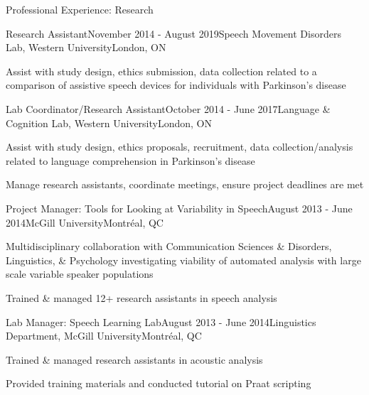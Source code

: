 \documentclass{resume} %
\begin{document}
\begin{rSection}{Professional Experience: Research}

	\begin{rSubsection}{Research Assistant}{November 2014 - August 2019}{Speech Movement Disorders Lab, Western University}{London, ON}
	\item Assist with study design, ethics submission, data collection related to a comparison of assistive speech devices for individuals with Parkinson's disease
	\end{rSubsection}
	
	
	\begin{rSubsection}{Lab Coordinator/Research Assistant}{October 2014 - June 2017}{Language \& Cognition Lab, Western University}{London, ON}
	\item Assist with study design, ethics proposals, recruitment, data collection/analysis related to language comprehension in Parkinson's disease
	\item Manage research assistants, coordinate meetings, ensure project deadlines are met
	\end{rSubsection}
	
	
	\begin{rSubsection}{Project Manager: Tools for Looking at Variability in Speech}{August 2013 - June 2014}{McGill University}{Montr\'eal, QC}
	\item Multidisciplinary collaboration with Communication Sciences \& Disorders, Linguistics, \& Psychology investigating viability of automated analysis with large scale variable speaker populations
	\item Trained \& managed 12+ research assistants in speech analysis
	\end{rSubsection}
	
	
	\begin{rSubsection}{Lab Manager: Speech Learning Lab}{August 2013 - June 2014}{Linguistics Department, McGill University}{Montr\'eal, QC}
	\item Trained \& managed research assistants in acoustic analysis
	\item Provided training materials and conducted tutorial on Praat scripting
	\end{rSubsection}
	

\end{rSection}
\end{document}
